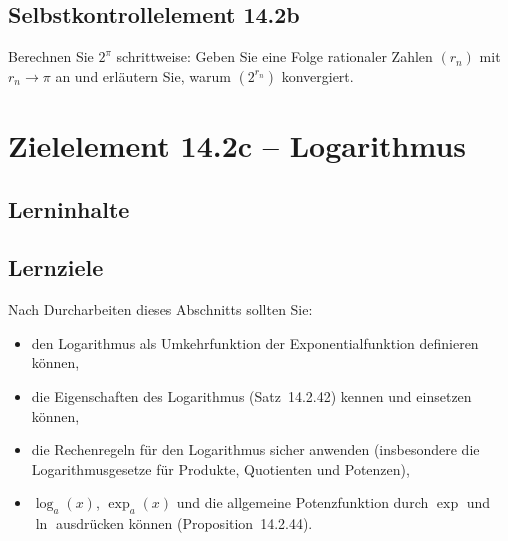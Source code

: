 \documentclass[a4paper,12pt]{article}
\begin{document}
\subsection*{Selbstkontrollelement 14.2b}

Berechnen Sie $2^\pi$ schrittweise: Geben Sie eine Folge rationaler Zahlen $(r_n)$
mit $r_n \to \pi$ an und erläutern Sie, warum $(2^{r_n})$ konvergiert.

\newpage

\section*{Zielelement 14.2c -- Logarithmus}

\subsection*{Lerninhalte}

\begin{center}
\end{center}

\subsection*{Lernziele}

Nach Durcharbeiten dieses Abschnitts sollten Sie:
\begin{itemize}
  \item den Logarithmus als Umkehrfunktion der Exponentialfunktion definieren können,
  \item die Eigenschaften des Logarithmus (Satz~14.2.42) kennen und einsetzen können,
  \item die Rechenregeln für den Logarithmus sicher anwenden (insbesondere die
        Logarithmusgesetze für Produkte, Quotienten und Potenzen),
  \item $\log_a(x)$, $\exp_a(x)$ und die allgemeine Potenzfunktion durch $\exp$ und
        $\ln$ ausdrücken können (Proposition~14.2.44).
\end{itemize}
\end{document}

